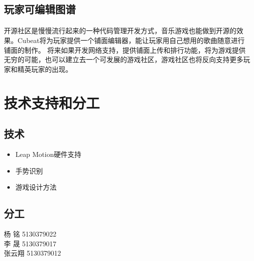 \documentclass{article} \usepackage{CJK}
\begin{document}
\subsection{玩家可编辑图谱}
\paragraph{}
开源社区是慢慢流行起来的一种代码管理开发方式，音乐游戏也能做到开源的效果。Cubeat将为玩家提供一个铺面编辑器，能让玩家用自己想用的歌曲随意进行铺面的制作。
将来如果开发网络支持，提供铺面上传和排行功能，将为游戏提供无穷的可能，也可以建立去一个可发展的游戏社区，游戏社区也将反向支持更多玩家和精英玩家的出现。
\section{技术支持和分工}
\subsection{技术}
\begin{itemize}
  \item Leap Motion硬件支持
  \item 手势识别
  \item 游戏设计方法
\end{itemize}
\subsection{分工}
\begin{description}
  \item[ 杨 铭 5130379022]
  \item[ 李 晟 5130379017]
  \item[张云翔 5130379012]
\end{description}
\end{document}
